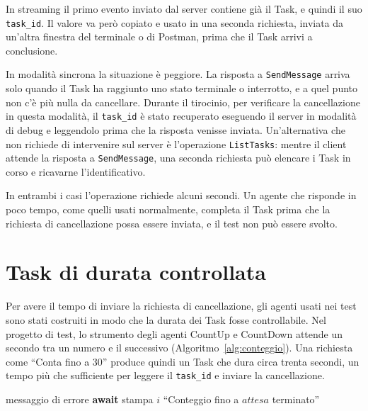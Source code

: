 In streaming il primo evento inviato dal server contiene già il Task, e quindi il suo \texttt{task\_id}. Il valore va però copiato e usato in una seconda richiesta, inviata da un'altra finestra del terminale o di Postman, prima che il Task arrivi a conclusione.

In modalità sincrona la situazione è peggiore. La risposta a \texttt{SendMessage} arriva solo quando il Task ha raggiunto uno stato terminale o interrotto, e a quel punto non c'è più nulla da cancellare. Durante il tirocinio, per verificare la cancellazione in questa modalità, il \texttt{task\_id} è stato recuperato eseguendo il server in modalità di debug e leggendolo prima che la risposta venisse inviata. Un'alternativa che non richiede di intervenire sul server è l'operazione \texttt{ListTasks}: mentre il client attende la risposta a \texttt{SendMessage}, una seconda richiesta può elencare i Task in corso e ricavarne l'identificativo.

In entrambi i casi l'operazione richiede alcuni secondi. Un agente che risponde in poco tempo, come quelli usati normalmente, completa il Task prima che la richiesta di cancellazione possa essere inviata, e il test non può essere svolto.

\section{Task di durata controllata}
\label{sec:durata-controllata}

Per avere il tempo di inviare la richiesta di cancellazione, gli agenti usati nei test sono stati costruiti in modo che la durata dei Task fosse controllabile. Nel progetto di test, lo strumento degli agenti CountUp e CountDown attende un secondo tra un numero e il successivo (Algoritmo~\ref{alg:conteggio}). Una richiesta come ``Conta fino a 30'' produce quindi un Task che dura circa trenta secondi, un tempo più che sufficiente per leggere il \texttt{task\_id} e inviare la cancellazione.

\begin{algorithm}[htbp]
\caption{\emph{Tool} di conteggio dell'agente CountUp}
\label{alg:conteggio}
\begin{algorithmic}[1]
        \State \Return messaggio di errore
    \EndIf
        \State \textbf{await}  
        \State stampa $i$
    \EndFor
    \State \Return ``Conteggio fino a $attesa$ terminato''
\EndFunction
\end{algorithmic}
\end{algorithm}

